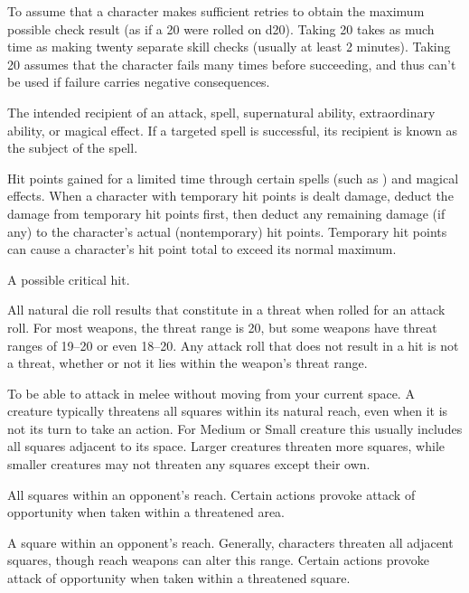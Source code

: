  To assume that a character makes sufficient retries to 
obtain the maximum possible check result (as if a 20 were rolled on 
d20). Taking 20 takes as much time as making twenty separate skill 
checks (usually at least 2 minutes). Taking 20 assumes that the 
character fails many times before succeeding, and thus can't be used 
if failure carries negative consequences. 

 The intended recipient of an attack, spell, supernatural 
ability, extraordinary ability, or magical effect. If a targeted spell is 
successful, its recipient is known as the subject of the spell. 

 Hit points gained for a limited time 
through certain spells (such as ) and magical effects. When a 
character with temporary hit points is dealt damage, deduct the 
damage from temporary hit points first, then deduct any remaining 
damage (if any) to the character's actual (nontemporary) hit points. 
Temporary hit points can cause a character's hit point total to exceed 
its normal maximum. 

 A possible critical hit. 

 All natural die roll results that constitute in a threat 
when rolled for an attack roll. For most weapons, the threat range is 
20, but some weapons have threat ranges of 19--20 or even 18--20. 
Any attack roll that does not result in a hit is not a threat, whether or 
not it lies within the weapon's threat range. 

 To be able to attack in melee without moving from 
your current space. A creature typically threatens all squares within 
its natural reach, even when it is not its turn to take an action. For 
Medium or Small creature this usually includes all squares adjacent 
to its space. Larger creatures threaten more squares, while smaller 
creatures may not threaten any squares except their own. 

 All squares within an opponent's reach. Certain actions provoke attack of opportunity when taken within a threatened area. 

 A square within an opponent's reach. Generally, characters threaten all adjacent squares, though reach weapons can alter this range. Certain actions provoke attack of 
opportunity when taken within a threatened square. 

